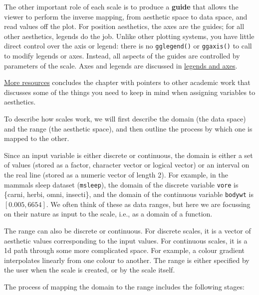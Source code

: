 The other important role of each scale is to produce a \textbf{guide}
that allows the viewer to perform the inverse mapping, from aesthetic
space to data space, and read values off the plot. For position
aesthetics, the axes are the guides; for all other aesthetics, legends
do the job. Unlike other plotting systems, you have little direct
control over the axis or legend: there is no \texttt{gglegend()} or
\texttt{ggaxis()} to call to modify legends or axes. Instead, all
aspects of the guides are controlled by parameters of the scale. Axes
and legends are discussed in \hyperref[sec:guides]{legends and axes}.

\hyperref[sec:scale-resources]{More resources} concludes the chapter
with pointers to other academic work that discusses some of the things
you need to keep in mind when assigning variables to aesthetics.


To describe how scales work, we will first describe the domain (the data
space) and the range (the aesthetic space), and then outline the process
by which one is mapped to the other.

Since an input variable is either discrete or continuous, the domain is
either a set of values (stored as a factor, character vector or logical
vector)  or an interval on the real line
(stored as a numeric vector of length 2). For example, in the mammals
sleep dataset (\texttt{msleep}), the domain of the discrete variable
\texttt{vore} is \{carni, herbi, omni, insecti\}, and the domain of the
continuous variable \texttt{bodywt} is \([0.005, 6654]\). We often think
of these as data ranges, but here we are focussing on their nature as
input to the scale, i.e., as a domain of a function.

The range can also be discrete or continuous. For discrete scales, it is
a vector of aesthetic values corresponding to the input values. For
continuous scales, it is a 1d path through some more complicated space.
For example, a colour gradient interpolates linearly from one colour to
another. The range is either specified by the user when the scale is
created, or by the scale itself.

The process of mapping the domain to the range includes the following
stages:

